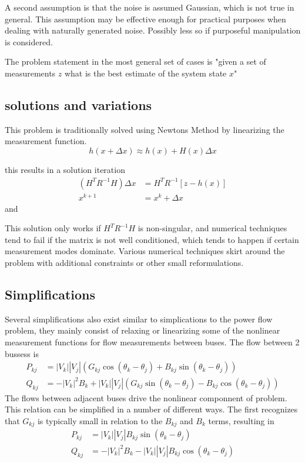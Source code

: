 \documentclass[11pt]{article} %
\begin{document}
A second assumption is that the noise is assumed Gaussian,  which is not true in general. This assumption may be effective enough for practical purposes when dealing with naturally generated noise.  Possibly less so if purposeful manipulation is considered.

The problem statement in the most general set of cases is "given a set of measurements $z$ what is the best estimate of the system state $x$"
\subsection{solutions and variations}
This problem is traditionally solved using Newtons Method by linearizing the measurement function.
\begin{equation}
h(x+\Delta x) \approx h(x)+H(x)\Delta x
\end{equation}

this results in a solution iteration
\begin{equation}
\begin{aligned}
\left(H^TR^{-1}H\right)\Delta x &= H^TR^{-1}\left[z-h(x)\right] \\
x^{k+1} &= x^k+\Delta x
\end{aligned}
\end{equation}
and


This solution only works if $H^TR^{-1}H$ is non-singular,  and numerical techniques tend to fail if the matrix is not well conditioned, which tends to happen if certain measurement modes dominate.  Various numerical techniques skirt around the problem with additional constraints or other small reformulations.



\subsection{Simplifications}
Several simplifications also exist similar to simplications to the power flow problem, they mainly consist of relaxing or linearizing some of the nonlinear measurement functions for flow measurements between buses.  The flow between 2 bussess is
\begin{equation}\label{Eq:powerflow}
\begin{aligned}
P_{kj} &= |V_k||V_j|\left(G_{kj}\cos(\theta_k-\theta_j) +  B_{kj}\sin(\theta_k-\theta_j)\right)\\
Q_{kj} &=  -|V_k|^2 B_{k}+|V_k||V_j|\left(G_{kj}\sin(\theta_k-\theta_j) - B_{kj}\cos(\theta_k-\theta_j)\right)
\end{aligned}
\end{equation}
The flows between adjacent buses drive the nonlinear componnent of problem.  This relation can be simplified in a number of different ways.  The first recognizes that $G_{kj}$ is typically small in relation to the $B_{kj}$ and $B_k$ terms,  resulting in
\begin{equation}\label{Eq:powerflow}
\begin{aligned}
P_{kj} &= |V_k||V_j| B_{kj}\sin(\theta_k-\theta_j)\\
Q_{kj} &=  -|V_k|^2 B_{k}-|V_k||V_j| B_{kj}\cos(\theta_k-\theta_j)
\end{aligned}
\end{equation}
\end{document}
